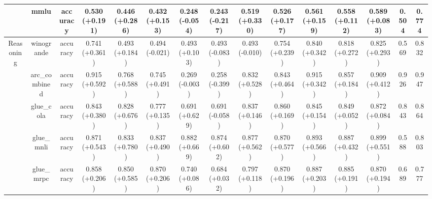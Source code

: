 \begin{landscape}
\begin{table}[ht]
{\begin{tabular}{ccccccccccccccc}
                                   & mmlu                           & accuracy                         & 0.530 (+0.191)     & 0.446 (+0.286)    & 0.432 (+0.153)             & 0.248 (-0.054)    & 0.243 (-0.217)             & 0.519 (+0.330)      & 0.526 (+0.177)           & 0.561 (+0.159)      & 0.558 (+0.112)               & 0.589 (+0.083)          & 0.504                  & 0.774          \\
\midrule
\multirow{13}{*}{Reasoning}        & winogrande                     & accuracy                         & 0.741 (+0.361)     & 0.493 (+0.184)    & 0.494 (-0.021)             & 0.493 (+0.103)    & 0.493 (-0.083)             & 0.493 (-0.010)      & 0.754 (+0.239)           & 0.840 (+0.342)      & 0.818 (+0.272)               & 0.825 (+0.293)          & 0.569                  & 0.832          \\
                                   & arc\_combined                  & accuracy                         & 0.915 (+0.592)     & 0.768 (+0.588)    & 0.745 (+0.491)             & 0.269 (-0.003)    & 0.258 (-0.399)             & 0.832 (+0.528)      & 0.843 (+0.464)           & 0.915 (+0.342)      & 0.857 (+0.184)               & 0.909 (+0.412)          & 0.926                  & 0.947          \\
                                   & glue\_cola                     & accuracy                         & 0.843 (+0.380)     & 0.828 (+0.676)    & 0.777 (+0.135)             & 0.691 (+0.629)    & 0.691 (-0.058)             & 0.837 (+0.146)      & 0.860 (+0.169)           & 0.845 (+0.154)      & 0.849 (+0.052)               & 0.872 (+0.084)          & 0.843                  & 0.864          \\
                                   & glue\_mnli                     & accuracy                         & 0.871 (+0.543)     & 0.833 (+0.780)    & 0.837 (+0.490)             & 0.882 (+0.669)    & 0.874 (+0.602)             & 0.877 (+0.562)      & 0.870 (+0.577)           & 0.893 (+0.566)      & 0.887 (+0.432)               & 0.899 (+0.551)          & 0.588                  & 0.803          \\
                                   & glue\_mrpc                     & accuracy                         & 0.858 (+0.206)     & 0.850 (+0.585)    & 0.870 (+0.206)             & 0.740 (+0.086)    & 0.684 (+0.032)             & 0.797 (+0.118)      & 0.870 (+0.196)           & 0.887 (+0.203)      & 0.885 (+0.191)               & 0.870 (+0.194)          & 0.689                  & 0.777          \\

\end{tabular}}
\end{table}
\end{landscape}

